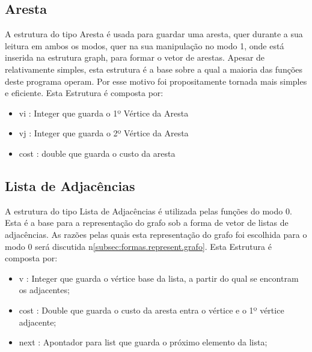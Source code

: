 \documentclass[14pt]{article}
\begin{document}
    \subsection[edge]{Aresta}\label{subsec:aresta}
    A estrutura do tipo Aresta é usada para guardar uma aresta, quer durante a sua leitura em ambos os modos, quer na
    sua manipulação no modo 1, onde está inserida na estrutura graph, para formar o vetor de arestas. Apesar de
    relativamente simples, esta estrutura é a base sobre a qual a maioria das funções deste programa operam. Por esse
    motivo foi propositamente tornada mais simples e eficiente.
    Esta Estrutura é composta por:
    \begin{itemize}
        \item vi : Integer que guarda o 1º Vértice da Aresta
        \item vj : Integer que guarda o 2º Vértice da Aresta
        \item cost : double que guarda o custo da aresta
    \end{itemize}

    \subsection[list]{Lista de Adjacências}\label{subsec:l.adj}
    A estrutura do tipo Lista de Adjacências é utilizada pelas funções do modo 0.
    Esta é a base para a representação do grafo sob a forma de vetor de listas de adjacências.
    As razões pelas quais esta representação do grafo foi escolhida para o modo 0 será discutida n\ref{subsec:formas.represent.grafo}.
    Esta Estrutura é composta por:
    \begin{itemize}
        \item v : Integer que guarda o vértice base da lista, a partir do qual se encontram os adjacentes;
        \item cost : Double que guarda o custo da aresta entra o vértice e o 1º vértice adjacente;
        \item next : Apontador para list que guarda o próximo elemento da lista;
    \end{itemize}
\end{document}
